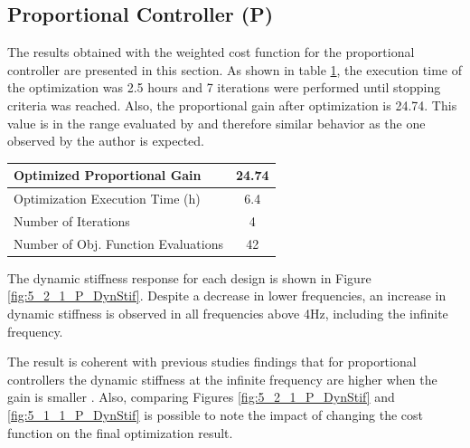 \subsection{Proportional Controller (P)}

The results obtained with the weighted cost function for the proportional controller are presented in this section. As shown in table \ref{table:5_2_1_PContExecution}, the execution time of the optimization was 2.5 hours and 7 iterations were performed until stopping criteria was reached. Also, the proportional gain after optimization is 24.74. This value is in the range evaluated by  and therefore similar behavior as the one observed by the author is expected. 

\begin{table}[H]
	\label{table:5_2_1_PContExecution}
	\centering
	\resizebox{7cm}{!} {
		\begin{tabular}{|l|c|}
			\hline
			Optimized Proportional Gain & 24.74 \\ \hline
			Optimization Execution Time (h) & 6.4 \\ \hline
			Number of Iterations & 4 \\ \hline	
			Number of Obj. Function Evaluations & 42 \\ \hline		
	\end{tabular}}
\end{table}

The  dynamic stiffness response for each design is shown in Figure \ref{fig:5_2_1_P_DynStif}. Despite a decrease in lower frequencies, an increase in dynamic stiffness is observed in all frequencies above 4Hz, including the infinite frequency. 

The result is coherent with previous studies findings that for proportional controllers the dynamic stiffness at the infinite frequency are higher when the gain is smaller \cite{Ballesteros}. Also, comparing Figures \ref{fig:5_2_1_P_DynStif} and \ref{fig:5_1_1_P_DynStif} is possible to note the impact of changing the cost function on the final optimization result.

